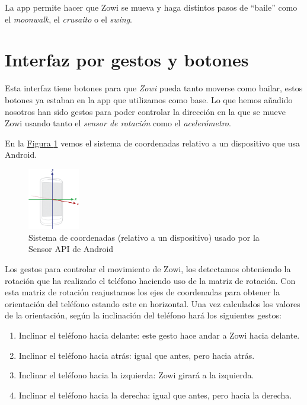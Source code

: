 \documentclass[10pt,a4paper,spanish]{article}
\begin{document}
La app permite hacer que Zowi se mueva y haga distintos pasos de ``baile'' como el \textit{\textcolor{denim}{moonwalk}}, el \textit{\textcolor{denim}{crusaito}} o el \textit{\textcolor{denim}{swing}}.

\section{\textcolor{denim}Interfaz por gestos y botones}
Esta interfaz tiene botones para que \textit{\textcolor{denim}{Zowi}} pueda tanto moverse como bailar, estos botones ya estaban en la app que utilizamos como base. Lo que hemos añadido nosotros han sido gestos para poder controlar la dirección en la que se mueve Zowi usando tanto el \textit{\textcolor{denim}{sensor de rotación}} como el \textit{\textcolor{denim}{acelerómetro}}.

En la \hyperref[axis]{Figura \ref*{axis}} vemos el sistema de coordenadas relativo a un dispositivo que usa Android.

\begin{figure}[!h]
    \centering
    \includegraphics[width=0.2\textwidth]{axis_device}
    \caption{Sistema de coordenadas (relativo a un dispositivo) usado por la Sensor API de Android}
    \label{axis}
\end{figure}

Los gestos para controlar el movimiento de Zowi, los detectamos obteniendo la rotación que ha realizado el teléfono haciendo uso de la matriz de rotación. Con esta matriz de rotación reajustamos los ejes de coordenadas para obtener la orientación del teléfono estando este en horizontal. Una vez calculados los valores de la orientación, según la inclinación del teléfono hará los siguientes gestos:

\begin{enumerate}[\qquad\ \color{denim}{$\bullet$}]
  \item Inclinar el teléfono hacia delante: este gesto hace andar a Zowi hacia delante.
  \item Inclinar el teléfono hacia atrás: igual que antes, pero hacia atrás.
  \item Inclinar el teléfono hacia la izquierda: Zowi girará a la izquierda.
  \item Inclinar el teléfono hacia la derecha: igual que antes, pero hacia la derecha.
\end{enumerate}
\end{document}
